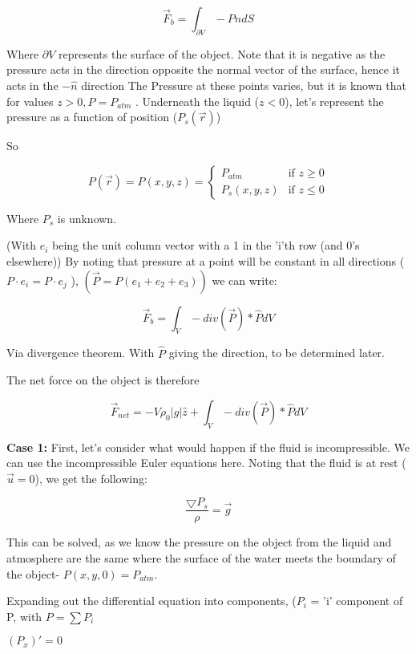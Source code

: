 \documentclass{article}
\begin{document}
$$\vec{F}_{b} = \int_{\partial V} -{P}\hat{n} dS$$

Where $\partial V$ represents the surface of the object. Note that it is negative as the pressure acts in the direction opposite the normal vector of the surface, hence it acts in the $-\hat{n}$ direction The Pressure at these points varies, but it is known that for values $z > 0, {P} = P_{atm}$ . Underneath the liquid ($z < 0$), let's represent the pressure as a function of position ($P_s(\vec{r})$)

So 

\begin{equation*}
P(\vec{r}) = P(x, y, z) =
\begin{cases}
P_{atm} & \text{if $z\ge 0$}\\
P_s(x, y, z) & \text{if $z\le 0$}
\end{cases}
\end{equation*}

Where $P_s$ is unknown. 

(With $e_i$ being the unit column vector with a 1 in the 'i'th row (and 0's elsewhere))
By noting that pressure at a point will be constant in all directions ($P\cdot e_i = P\cdot e_j$ ), $(\vec{P} = P(e_1 + e_2 + e_3))$  we can write:


$$\vec{F}_{b} = \int_{V} -div(\vec{P})*\hat{P} dV$$

Via divergence theorem. With $\hat{P}$ giving the direction, to be determined later.

The net force on the object is therefore

$$\vec{F}_{net} =  - V \rho_0|g| \hat{z} + \int_{V} -div(\vec{P})*\hat{P}  dV $$

\vspace{2.9cm}

\textbf{Case 1:} First, let's consider what would happen if the fluid is incompressible. We can use the incompressible Euler equations here. Noting that the fluid is at rest ($\vec{u} = 0$), we get the following:

$$\frac{\bigtriangledown P_s}{\rho} = \vec{g}$$

This can be solved, as we know the pressure on the object from the liquid and atmosphere are the same where the surface of the water meets the boundary of the object- $P(x, y, 0) = P_{atm}$. 

Expanding out the differential equation into components, ($P_i$ = 'i' component of P, with $P = \sum P_i$

$(P_x)' = 0$
\end{document}
